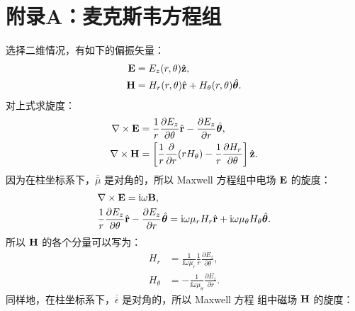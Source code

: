 
\chapter{附录A：麦克斯韦方程组}

选择二维情况，有如下的偏振矢量：
\begin{subequations}
  \begin{align}
    {\bf E} &= E_z(r, \theta) \hat{\bf z}, \\
    {\bf H} &= H_r(r, \theta) \hat{\bf r} + H_\theta(r, \theta) \hat{\bm\theta}.
  \end{align}
\end{subequations}
对上式求旋度：
\begin{subequations}
  \begin{align}
    \nabla \times {\bf E} &= \frac{1}{r} \frac{\partial E_z}{\partial\theta}
      \hat{\bf r} - \frac{\partial E_z}{\partial r} \hat{\bm\theta}, \\
    \nabla \times {\bf H} &= \left[\frac{1}{r} \frac{\partial}{\partial r}
      (r H_\theta) - \frac{1}{r} \frac{\partial H_r}{\partial\theta} \right]
      \hat{\bf z}.
  \end{align}
\end{subequations}
因为在柱坐标系下，$\overline{\overline\mu}$ 是对角的，所以 Maxwell 方程组中电场
$\bf E$ 的旋度：
\begin{subequations}
  \begin{align}
    & \nabla \times {\bf E} = \mathrm{i} \omega {\bf B}, \\
    & \frac{1}{r} \frac{\partial E_z}{\partial\theta} \hat{\bf r} -
      \frac{\partial E_z}{\partial r}\hat{\bm\theta} = \mathrm{i} \omega \mu_r H_r
      \hat{\bf r} + \mathrm{i} \omega \mu_\theta H_\theta \hat{\bm\theta}.
  \end{align}
\end{subequations}
所以 $\bf H$ 的各个分量可以写为：
\begin{subequations}
  \begin{align}
    H_r &= \frac{1}{\ii \omega \mu_r} \frac{1}{r}
      \frac{\partial E_z}{\partial\theta}, \\
    H_\theta &= -\frac{1}{\ii \omega \mu_\theta}
      \frac{\partial E_z}{\partial r}.
  \end{align}
\end{subequations}
同样地，在柱坐标系下，$\overline{\overline\epsilon}$ 是对角的，所以 Maxwell 方程
组中磁场 $\bf H$ 的旋度：
